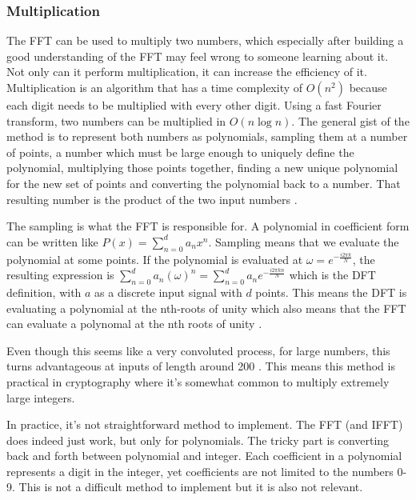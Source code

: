 \subsubsection{Multiplication}
The FFT can be used to multiply two numbers, which especially after building a good understanding of the FFT may feel wrong to someone learning about it. Not only can it perform multiplication, it can increase the efficiency of it. Multiplication is an algorithm that has a time complexity of $O(n^2)$ because each digit needs to be multiplied with every other digit. Using a fast Fourier transform, two numbers can be multiplied in $O(n \log n)$. The general gist of the method is to represent both numbers as polynomials, sampling them at a number of points, a number which must be large enough to uniquely define the polynomial, multiplying those points together, finding a new unique polynomial for the new set of points and converting the polynomial back to a number. That resulting number is the product of the two input numbers \cite{Reducible2020}. 

The sampling is what the FFT is responsible for. A polynomial in coefficient form can be written like $P(x) = \sum^d_{n=0} a_nx^n$. Sampling means that we evaluate the polynomial at some points. If the polynomial is evaluated at $\omega = e^{-\frac{i2\pi k}{N}}$, the resulting expression is $\sum^d_{n=0} a_n(\omega)^n = \sum^d_{n=0} a_ne^{-\frac{i2\pi k n}{N}}$ which is the DFT definition, with $a$ as a discrete input signal with $d$ points. This means the DFT is evaluating a polynomial at the nth-roots of unity which also means that the FFT can evaluate a polynomal at the nth roots of unity \cite{Emerencia2007}.

Even though this seems like a very convoluted process, for large numbers, this turns advantageous at inputs of length around 200 \cite{Emerencia2007}. This means this method is practical in cryptography where it's somewhat common to multiply extremely large integers. 

In practice, it's not straightforward method to implement. The FFT (and IFFT) does indeed just work, but only for polynomials. The tricky part is converting back and forth between polynomial and integer. Each coefficient in a polynomial represents a digit in the integer, yet coefficients are not limited to the numbers 0-9. This is not a difficult method to implement but it is also not relevant. 






